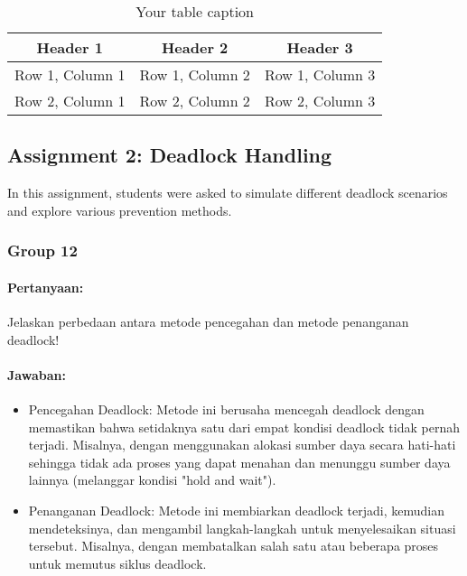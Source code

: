 \documentclass[12pt]{article}
\begin{document}
\begin{table}[htbp] %
    \centering
    \begin{tabular}{|c|c|c|} %
    \hline
    Header 1 & Header 2 & Header 3 \\ %
    \hline
    Row 1, Column 1 & Row 1, Column 2 & Row 1, Column 3 \\ %
    \hline
    Row 2, Column 1 & Row 2, Column 2 & Row 2, Column 3 \\ %
    \hline
    \end{tabular}
    \caption{Your table caption} %
    \label{tab:your_label} %
\end{table}
\subsection{Assignment 2: Deadlock Handling}
In this assignment, students were asked to simulate different deadlock scenarios and explore various prevention methods.


\subsubsection{Group 12}

\paragraph{Pertanyaan:} Jelaskan perbedaan antara metode pencegahan dan metode penanganan deadlock!

\paragraph{Jawaban:} 
\begin{itemize}
    \item Pencegahan Deadlock: Metode ini berusaha mencegah deadlock dengan memastikan bahwa setidaknya satu dari empat kondisi deadlock tidak pernah terjadi. Misalnya, dengan menggunakan alokasi sumber daya secara hati-hati sehingga tidak ada proses yang dapat menahan dan menunggu sumber daya lainnya (melanggar kondisi "hold and wait").

    \item Penanganan Deadlock: Metode ini membiarkan deadlock terjadi, kemudian mendeteksinya, dan mengambil langkah-langkah untuk menyelesaikan situasi tersebut. Misalnya, dengan membatalkan salah satu atau beberapa proses untuk memutus siklus deadlock.
\end{itemize}
\end{document}
